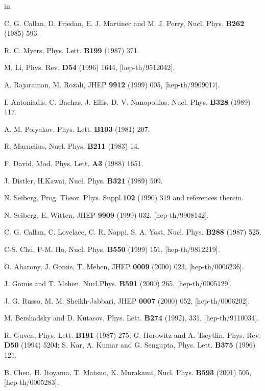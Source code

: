 \documentclass[a4paper,12pt]{article}
\begin{document}
 in
\begin{thebibliography}{99}

C. G. Callan, D. Friedan, E. J. Martinec and 
M. J. Perry, Nucl. Phys. {\bf B262} (1985) 593.

R. C. Myers, Phys. Lett. {\bf B199} (1987) 371.

M. Li, Phys. Rev. {\bf D54} (1996) 1644, [hep-th/9512042].

A. Rajaraman, M. Rozali, JHEP {\bf 9912} (1999) 005,
[hep-th/9909017].

I. Antoniadis, C. Bachas, J. Ellis, D. V. Nanopoulos,
Nucl. Phys. {\bf B328} (1989) 117.

A. M. Polyakov, Phys. Lett. {\bf B103} (1981) 207.

R. Marnelius, Nucl. Phys. {\bf B211} (1983) 14.

F. David, Mod. Phys. Lett. {\bf A3} (1988) 1651.

J. Distler, H.Kawai, Nucl. Phys. {\bf B321} (1989) 509.

N. Seiberg, Prog. Theor. Phys. Suppl.{\bf 102} (1990) 319
and references therein.

N. Seiberg, E. Witten, JHEP {\bf 9909} (1999) 032, 
[hep-th/9908142].

C. G. Callan, C. Lovelace, C. R. Nappi, S. A. Yost, 
         Nucl. Phys. {\bf B288} (1987) 525.

C-S. Chu, P-M. Ho, Nucl. Phys. {\bf B550} (1999) 151, 
                  [hep-th/9812219].

O. Aharony, J. Gomis, T. Mehen, JHEP {\bf 0009} (2000) 023,
[hep-th/0006236].

 J. Gomis and T. Mehen, Nucl.Phys. {\bf B591} (2000) 
265, [hep-th/0005129]. 

J. G. Russo, M. M. Sheikh-Jabbari, JHEP {\bf 0007} 
(2000) 052, [hep-th/0006202].

M. Bershadsky and D. Kutasov, Phys. Lett. 
{\bf B274} (1992), 331, [hep-th/9110034].

 R. Guven, Phys. Lett. {\bf B191} (1987) 275;
  G. Horowitz and A. Tseytlin, Phys. Rev. {\bf D50} (1994) 5204; 
  S. Kar, A. Kumar and G. Sengupta, Phys. Lett. {\bf B375} (1996) 121. 

B. Chen, H. Itoyama, T. Matsuo, K. Murakami,  
         Nucl. Phys. {\bf B593} (2001) 505, [hep-th/0005283]. 



\end{thebibliography}
\end{document}
